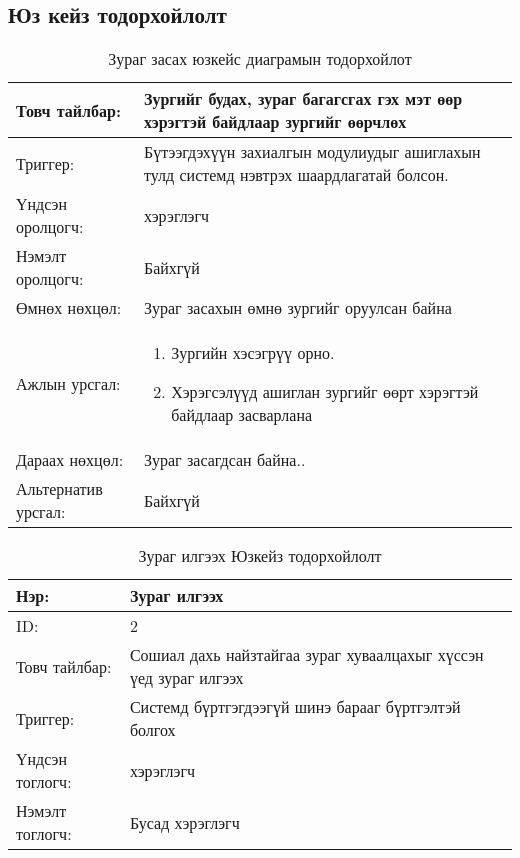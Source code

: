 \begin{itemize}
\subsection{ Юз кейз тодорхойлолт }
\begin{center}
	\begin{table}[!htbp]
		\caption{Зураг засах юзкейс диаграмын тодорхойлот}
		\begin{tabular}{|p{4cm}|p{11cm}|}
			\hline
			Товч тайлбар: &Зургийг будах, зураг багагсгах гэх мэт өөр хэрэгтэй байдлаар зургийг өөрчлөх \\
			\hline
			Триггер: & Бүтээгдэхүүн захиалгын модулиудыг ашиглахын тулд системд нэвтрэх шаардлагатай болсон. \\
			\hline
			Үндсэн оролцогч: &  хэрэглэгч \\
			\hline
			Нэмэлт оролцогч: & Байхгүй \\
			\hline
			Өмнөх нөхцөл: &  Зураг засахын өмнө зургийг оруулсан байна\\
			\hline
			Ажлын урсгал: & \begin{enumerate}
				\item Зургийн хэсэгрүү орно.
				\item	Хэрэгсэлүүд ашиглан зургийг өөрт хэрэгтэй байдлаар засварлана
				
			\end{enumerate}
				\\		 
			 \hline
			Дараах нөхцөл: & 	Зураг засагдсан байна.. 	\\	
		   
		  \hline	Альтернатив урсгал: & 	Байхгүй	 
			
			\\	\hline
		\end{tabular}
	\end{table}
\end{center}


\begin{center}
	\begin{table}[!htbp]
		\caption{Зураг илгээх Юзкейз тодорхойлолт}
		\begin{tabular}{|p{4cm}|p{11cm}|}
			\hline
			Нэр: & Зураг илгээх \\
			\hline
			ID: &2\\
			\hline
			Товч тайлбар: &Сошиал дахь найзтайгаа зураг хуваалцахыг хүссэн үед зураг илгээх \\
			\hline
			Триггер: & Системд бүртгэгдээгүй шинэ барааг бүртгэлтэй болгох \\
			\hline
			Үндсэн тоглогч: & хэрэглэгч \\
			\hline
			Нэмэлт тоглогч: & Бусад хэрэглэгч \\
			\hline
			

\end{tabular}
\end{table}
\end{center}
\end{itemize}
